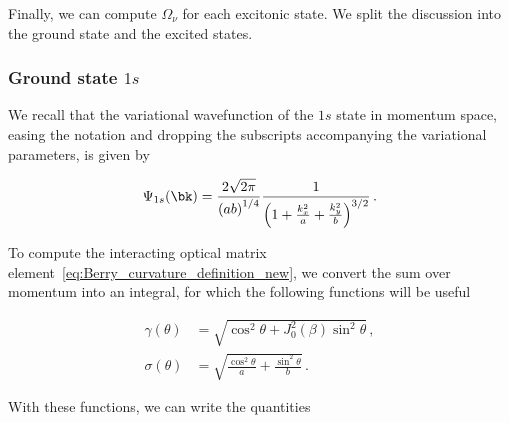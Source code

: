 %
%

Finally, we can compute $\Omega_\nu$ for each excitonic state.
We split the discussion into the ground state and the excited states.

\subsubsection{Ground state $1s$}
\label{subsubsec:ground_state_1s}

We recall that the variational wavefunction of the $1s$ state in momentum space, easing the notation and dropping the subscripts accompanying the variational parameters, is given by

\begin{equation}
    \Psi_{1s}(\bk) =\frac{2\sqrt{2\pi}}{\left(a b\right)^{1/4}}\frac{1}{\left(1+\frac{k_{x}^{2}}{a}+\frac{k_{y}^{2}}{b}\right)^{3/2}} \,.
\end{equation}

\noindent To compute the interacting optical matrix element~\eqref{eq:Berry_curvature_definition_new}, we convert the sum over momentum into an integral, for which the following functions will be useful

\begin{equation}
    \begin{aligned}
        \gamma(\theta) &= \sqrt{\cos^{2}\theta+J_{0}^{2}(\beta)\sin^{2}\theta} \,,\\
        \sigma(\theta) &=\sqrt{\frac{\cos^{2}\theta}{a}+\frac{\sin^{2}\theta}{b}} \,.
    \end{aligned}
\end{equation}

\noindent With these functions, we can write the quantities

